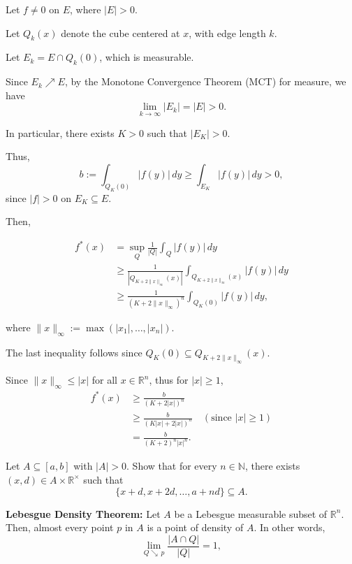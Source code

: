 \documentclass[UTF8,a4paper,10pt]{article}
\begin{document}
Let $f \neq 0$ on $E$, where $|E| > 0$. 

Let $Q_k(x)$ denote the cube centered at $x$, with edge length $k$.

Let $E_k = E \cap Q_k(0)$, which is measurable. 

Since $E_k \nearrow  E$, by the Monotone Convergence Theorem (MCT) for measure, we have
\[
\lim_{k \to \infty} |E_k| = |E| > 0.
\]

In particular, there exists $K > 0$ such that $|E_K| > 0$.

Thus,
\[
b := \int_{Q_K(0)} |f(y)| \, dy \geq \int_{E_K} |f(y)| \, dy > 0,
\]
since $|f| > 0$ on $E_K \subseteq E$.

Then,

\begin{align*}
  f^*(x) &= \sup_{Q} \frac{1}{|Q|} \int_{Q} |f(y)| \, dy \\
  &\geq \frac{1}{|Q_{K+2\|x\|_\infty}(x)|} \int_{Q_{K+2\|x\|_\infty}(x)} |f(y)| \, dy \\
  &\geq \frac{1}{(K + 2\|x\|_\infty)^n} \int_{Q_K(0)} |f(y)| \, dy,
\end{align*}

where $\|x\|_\infty := \max(|x_1|, \ldots, |x_n|)$.

The last inequality follows since $Q_K(0) \subseteq Q_{K+2\|x\|_\infty}(x)$.

Since $\|x\|_\infty \leq |x|$ for all $x \in \mathbb{R}^n$, thus for $|x| \geq 1$,
\begin{align*}
  f^*(x) &\geq \frac{b}{(K + 2|x|)^n} \\
  &\geq \frac{b}{(K|x| + 2|x|)^n} \quad (\text{since } |x| \geq 1) \\
  &= \frac{b}{(K + 2)^n|x|^n}.
\end{align*}


\pagebreak

\begin{Problem}[]{}
  Let $A \subseteq [a, b]$ with $|A| > 0$. Show that for every \(n\in \mathbb{N} \), there exists $(x,d) \in A \times\mathbb{R}^{\times}$ such that
  $$
  \{x + d, x + 2d, \ldots, a + nd\} \subseteq A
  .$$
  
  
  

\end{Problem}


\textbf{Lebesgue Density Theorem:} Let $A$ be a Lebesgue measurable subset of $\mathbb{R}^n$. Then, almost every point $p$ in $A$ is a point of density of $A$. In other words,
\[
\lim_{Q\searrow\, p} \frac{|A \cap Q|}{|Q|} = 1
,\]
\end{document}
